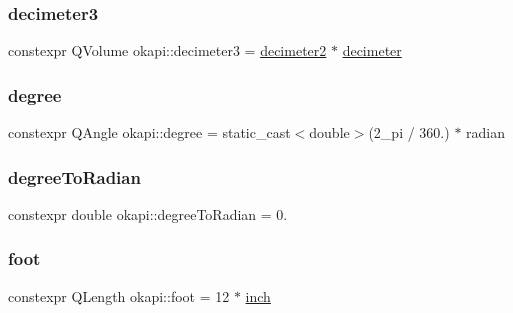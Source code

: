 \mbox{\label{namespaceokapi_a4f07207ec37be4257d882710d97a3de9}} 
\subsubsection{\texorpdfstring{decimeter3}{decimeter3}}
{\footnotesize\ttfamily constexpr Q\+Volume okapi\+::decimeter3 = \mbox{\hyperlink{namespaceokapi_a554ff440baa9c27432dcbc8068fbf47e}{decimeter2}} $\ast$ \mbox{\hyperlink{namespaceokapi_adeefe08fd5193fd9090e198b1a3463b9}{decimeter}}}

\mbox{\label{namespaceokapi_a62211562b2e637742bd6e64748802211}} 
\subsubsection{\texorpdfstring{degree}{degree}}
{\footnotesize\ttfamily constexpr Q\+Angle okapi\+::degree = static\+\_\+cast$<$double$>$(2\+\_\+pi / 360.) $\ast$ radian}

\mbox{\label{namespaceokapi_a60e2f3e682c91a331aa5d89d8c0d6507}} 
\subsubsection{\texorpdfstring{degreeToRadian}{degreeToRadian}}
{\footnotesize\ttfamily constexpr double okapi\+::degree\+To\+Radian = 0.\hspace{0.3cm}{\ttfamily [static]}}

\mbox{\label{namespaceokapi_a76974d5bf7ed9473b2d59153894a8587}} 
\subsubsection{\texorpdfstring{foot}{foot}}
{\footnotesize\ttfamily constexpr Q\+Length okapi\+::foot = 12 $\ast$ \mbox{\hyperlink{namespaceokapi_a7da6f1f2fa46ec3694ba3f5361bcba80}{inch}}}

\mbox{\label{namespaceokapi_a30332192fb24d5d1f81883969ec4878a}} 
